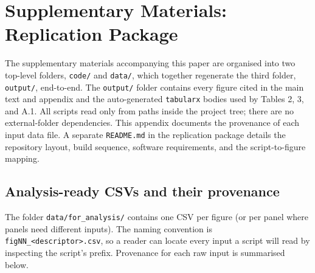 
\clearpage
\section{Supplementary Materials: Replication Package} \label{app:supplementary}

The supplementary materials accompanying this paper are organised into two
top-level folders, \texttt{code/} and \texttt{data/}, which together
regenerate the third folder, \texttt{output/}, end-to-end. The
\texttt{output/} folder contains every figure cited in the main text and
appendix and the auto-generated \texttt{tabularx} bodies used by Tables 2,
3, and A.1. All scripts read only from paths inside the project tree;
there are no external-folder dependencies. This appendix documents the
provenance of each input data file. A separate \texttt{README.md} in the
replication package details the repository layout, build sequence,
software requirements, and the script-to-figure mapping.

\subsection{Analysis-ready CSVs and their provenance}

The folder \texttt{data/for\_analysis/} contains one CSV per figure (or per
panel where panels need different inputs). The naming convention is
\texttt{figNN\_<descriptor>.csv}, so a reader can locate every input a
script will read by inspecting the script's prefix. Provenance for each raw
input is summarised below.

